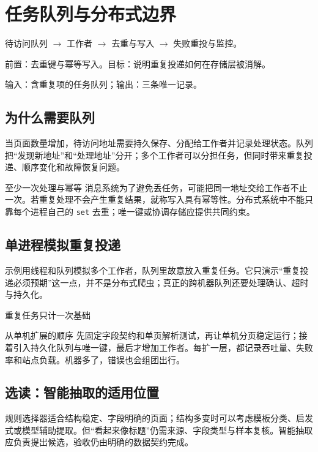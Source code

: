 \chapter{任务队列与分布式边界}\label{ch:scale}
\begin{tcolorbox}[title=章首知识地图,colframe=Ink]
待访问队列 $\longrightarrow$ 工作者 $\longrightarrow$ 去重与写入 $\longrightarrow$ 失败重投与监控。
\end{tcolorbox}

\begin{tcolorbox}[title=学习目标与前置知识,colframe=Ink!65,colback=Ink!2]
前置：去重键与幂等写入。目标：说明重复投递如何在存储层被消解。\par
输入：含重复项的任务队列；输出：三条唯一记录。
\end{tcolorbox}

\section{为什么需要队列}
当页面数量增加，待访问地址需要持久保存、分配给工作者并记录处理状态。队列把“发现新地址”和“处理地址”分开；多个工作者可以分担任务，但同时带来重复投递、顺序变化和故障恢复问题。

\begin{definition}{至少一次处理与幂等}
消息系统为了避免丢任务，可能把同一地址交给工作者不止一次。若重复处理不会产生重复结果，就称写入具有幂等性。分布式系统中不能只靠每个进程自己的 \texttt{set} 去重；唯一键或协调存储应提供共同约束。
\end{definition}

\section{单进程模拟重复投递}
示例用线程和队列模拟多个工作者，队列里故意放入重复任务。它只演示“重复投递必须预期”这一点，并不是分布式爬虫；真正的跨机器队列还要处理确认、超时与持久化。

\begin{example}{重复任务只计一次}{基础}
\end{example}

\begin{method}{从单机扩展的顺序}
先固定字段契约和单页解析测试，再让单机分页稳定运行；接着引入持久化队列与唯一键，最后才增加工作者。每扩一层，都记录吞吐量、失败率和站点负载。机器多了，错误也会组团出行。
\end{method}

\section{选读：智能抽取的适用位置}
规则选择器适合结构稳定、字段明确的页面；结构多变时可以考虑模板分类、启发式或模型辅助提取。但“看起来像标题”仍需来源、字段类型与样本复核。智能抽取应负责提出候选，验收仍由明确的数据契约完成。

